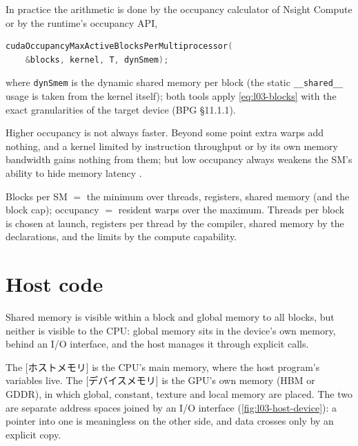 \documentclass[../main.tex]{subfiles}
\begin{document}
In practice the arithmetic is done by the occupancy calculator of Nsight
Compute or by the runtime's occupancy API,
\begin{lstlisting}[language=C++, numbers=none]
cudaOccupancyMaxActiveBlocksPerMultiprocessor(
    &blocks, kernel, T, dynSmem);
\end{lstlisting}
where \texttt{dynSmem} is the dynamic shared memory per block (the static
\texttt{\_\_shared\_\_} usage is taken from the kernel itself); both tools
apply \cref{eq:l03-blocks} with the exact granularities of the
target device (BPG §11.1.1).

Higher occupancy is not always faster.  Beyond some point extra warps add
nothing, and a kernel limited by instruction throughput or by its own
memory bandwidth gains nothing from them; but low occupancy always
weakens the SM's ability to hide memory latency
\cite[§11.1]{nvidia2026cudabestpractices}.

\begin{keypoint}
  Blocks per SM $=$ the minimum over threads, registers, shared memory
  (and the block cap); occupancy $=$ resident warps over the maximum.
  Threads per block is chosen at launch, registers per thread by the
  compiler, shared memory by the declarations, and the limits by the
  compute capability.
\end{keypoint}

\section{Host code}
\label{sec:l03-host}

Shared memory is visible within a block and global memory to all blocks,
but neither is visible to the CPU: global memory sits in the device's own
memory, behind an I/O interface, and the host manages it through explicit
calls.

\begin{definition}
  The [ホストメモリ] is the CPU's main memory, where
  the host program's variables live.  The [デバイスメモリ]
  is the GPU's own memory (HBM or GDDR), in which global, constant,
  texture and local memory are placed.  The two are separate address
  spaces joined by an I/O interface (\cref{fig:l03-host-device}): a
  pointer into one is meaningless on the other side, and data crosses
  only by an explicit copy.
\end{definition}
\end{document}
